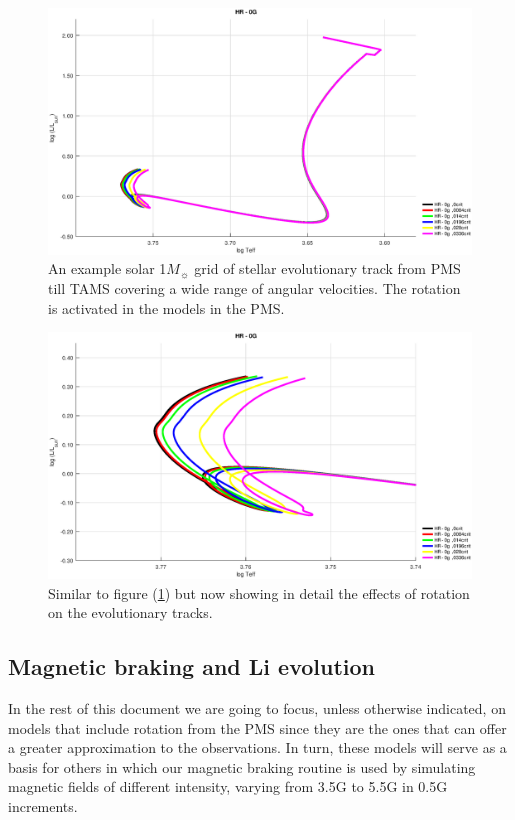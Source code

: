 \documentclass[fleqn,usenatbib]{mnras}
\begin{document}
\begin{figure}
	\includegraphics[width=\columnwidth]{figures/hr_var_vel_0g.eps}
    \caption{An example solar 1$M_{\sun}$ grid of stellar evolutionary track from PMS till TAMS covering a wide range of angular velocities. The rotation is activated in the models in the PMS.}
    \label{fig:hr_var_vel_0g}
\end{figure}

\begin{figure}
	\includegraphics[width=\columnwidth]{figures/hr_var_vel_0g_z1.eps}
    \caption{Similar to figure (\ref{fig:hr_var_vel_0g}) but now showing in detail the effects of rotation on the evolutionary tracks.}
    \label{fig:hr_var_vel_0g_z1}
\end{figure}


\subsection{Magnetic braking and Li evolution}
In the rest of this document we are going to focus, unless otherwise indicated, on models that include rotation from the PMS since they are the ones that can offer a greater approximation to the observations. In turn, these models will serve as a basis for others in which our magnetic braking routine is used by simulating magnetic fields of different intensity, varying from 3.5G to 5.5G in 0.5G increments.\par
\end{document}
